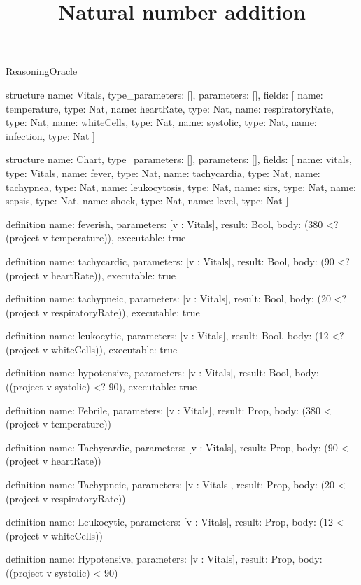 \begin{lexlean}{ReasoningOracle}
\title{Natural number addition}
\begin{semanticmodule}
structure{
  name: Vitals,
  type_parameters: [],
  parameters: [],
  fields: [
    {name: temperature, type: Nat},
    {name: heartRate, type: Nat},
    {name: respiratoryRate, type: Nat},
    {name: whiteCells, type: Nat},
    {name: systolic, type: Nat},
    {name: infection, type: Nat}
  ]
}

structure{
  name: Chart,
  type_parameters: [],
  parameters: [],
  fields: [
    {name: vitals, type: Vitals},
    {name: fever, type: Nat},
    {name: tachycardia, type: Nat},
    {name: tachypnea, type: Nat},
    {name: leukocytosis, type: Nat},
    {name: sirs, type: Nat},
    {name: sepsis, type: Nat},
    {name: shock, type: Nat},
    {name: level, type: Nat}
  ]
}

definition{
  name: feverish,
  parameters: [v : Vitals],
  result: Bool,
  body: (380 <? (project v temperature)),
  executable: true
}

definition{
  name: tachycardic,
  parameters: [v : Vitals],
  result: Bool,
  body: (90 <? (project v heartRate)),
  executable: true
}

definition{
  name: tachypneic,
  parameters: [v : Vitals],
  result: Bool,
  body: (20 <? (project v respiratoryRate)),
  executable: true
}

definition{
  name: leukocytic,
  parameters: [v : Vitals],
  result: Bool,
  body: (12 <? (project v whiteCells)),
  executable: true
}

definition{
  name: hypotensive,
  parameters: [v : Vitals],
  result: Bool,
  body: ((project v systolic) <? 90),
  executable: true
}

definition{
  name: Febrile,
  parameters: [v : Vitals],
  result: Prop,
  body: (380 < (project v temperature))
}

definition{
  name: Tachycardic,
  parameters: [v : Vitals],
  result: Prop,
  body: (90 < (project v heartRate))
}

definition{
  name: Tachypneic,
  parameters: [v : Vitals],
  result: Prop,
  body: (20 < (project v respiratoryRate))
}

definition{
  name: Leukocytic,
  parameters: [v : Vitals],
  result: Prop,
  body: (12 < (project v whiteCells))
}

definition{
  name: Hypotensive,
  parameters: [v : Vitals],
  result: Prop,
  body: ((project v systolic) < 90)
}


\end{semanticmodule}
\end{lexlean}
